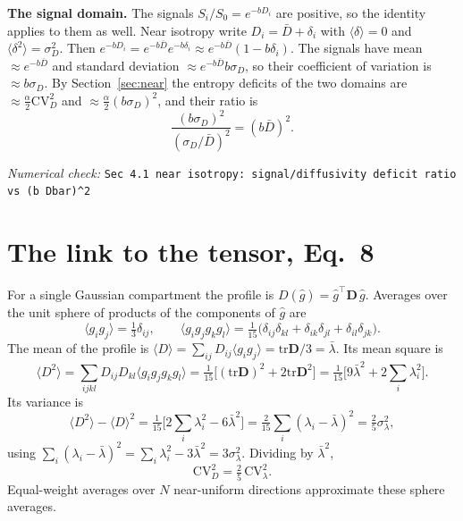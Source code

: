 \documentclass[11pt]{article}
\newcommand{\CV}{\mathrm{CV}}
\newcommand{\tr}{\mathrm{tr}}
\newcommand{\numcheck}[1]{\par{\small\raggedright\noindent\textit{Numerical check:} \texttt{#1}\par}}
\begin{document}
\textbf{The signal domain.} The signals $S_i/S_0 = e^{-bD_i}$ are positive, so the identity applies to them as
well. Near isotropy write $D_i = \bar D + \delta_i$ with $\langle\delta\rangle = 0$ and $\langle\delta^2\rangle =
\sigma_D^2$. Then $e^{-bD_i} = e^{-b\bar D}e^{-b\delta_i} \approx e^{-b\bar D}(1-b\delta_i)$. The signals have mean
$\approx e^{-b\bar D}$ and standard deviation $\approx e^{-b\bar D}b\sigma_D$, so their coefficient of variation is
$\approx b\sigma_D$. By Section~\ref{sec:near} the entropy deficits of the two domains are $\approx\frac{\alpha}{2}\CV_D^2$ and
$\approx\frac{\alpha}{2}(b\sigma_D)^2$, and their ratio is
\begin{equation}
\frac{(b\sigma_D)^2}{(\sigma_D/\bar D)^2} = (b\bar D)^2 .
\end{equation}
\numcheck{Sec 4.1 near isotropy: signal/diffusivity deficit ratio vs (b Dbar)\^{}2}

\section{The link to the tensor, Eq.~8}

For a single Gaussian compartment the profile is $D(\hat g) = \hat g^{\top}\mathbf D\,\hat g$. Averages over the unit
sphere of products of the components of $\hat g$ are
\begin{equation}
\langle g_ig_j\rangle = \tfrac13\delta_{ij}, \qquad
\langle g_ig_jg_kg_l\rangle = \tfrac{1}{15}\bigl(\delta_{ij}\delta_{kl} + \delta_{ik}\delta_{jl} + \delta_{il}\delta_{jk}\bigr) .
\end{equation}
The mean of the profile is
$\langle D\rangle = \sum_{ij}D_{ij}\langle g_ig_j\rangle = \tr\mathbf D/3 = \bar\lambda$. Its mean square is
\begin{equation}
\langle D^2\rangle = \sum_{ijkl}D_{ij}D_{kl}\langle g_ig_jg_kg_l\rangle
= \tfrac{1}{15}\bigl[(\tr\mathbf D)^2 + 2\tr\mathbf D^2\bigr]
= \tfrac{1}{15}\bigl[9\bar\lambda^2 + 2\textstyle\sum_i\lambda_i^2\bigr] .
\end{equation}
Its variance is
\begin{equation}
\langle D^2\rangle - \langle D\rangle^2 = \tfrac{1}{15}\bigl[2\textstyle\sum_i\lambda_i^2 - 6\bar\lambda^2\bigr]
= \tfrac{2}{15}\textstyle\sum_i(\lambda_i-\bar\lambda)^2 = \tfrac25\sigma_\lambda^2 ,
\end{equation}
using $\sum_i(\lambda_i-\bar\lambda)^2 = \sum_i\lambda_i^2 - 3\bar\lambda^2 = 3\sigma_\lambda^2$. Dividing by
$\bar\lambda^2$,
\begin{equation}
\CV_D^2 = \tfrac25\,\CV_\lambda^2 .
\end{equation}
Equal-weight averages over $N$ near-uniform directions approximate these sphere averages.
\end{document}
